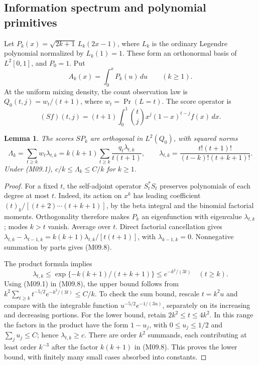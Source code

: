 \documentclass[11pt,a4paper]{article}
\newtheorem{lemma}[theorem]{Lemma}
\theoremstyle{definition}\newtheorem{definition}[theorem]{Definition}
\theoremstyle{remark}\newtheorem{remark}[theorem]{Remark}
\numberwithin{equation}{section}
\begin{document}
\subsection{Information spectrum and polynomial primitives}\label{M09-sec-3}
Let $P_k(x)=\sqrt{2k+1}\,L_k(2x-1)$, where $L_k$ is the ordinary Legendre polynomial normalized by $L_k(1)=1$. These form an orthonormal basis of $L^2[0,1]$, and $P_0=1$. Put
\[
 A_k(x)=\int_0^xP_k(u)\,du\qquad(k\ge1).
\]
At the uniform mixing density, the count observation law is $Q_0(t,j)=w_t/(t+1)$, where $w_t=\Pr(L=t)$. The score operator is
\[
 (Sf)(t,j)=(t+1)\int_0^1 \binom{t}{j}x^j(1-x)^{t-j}f(x)\,dx.
\]

\begin{lemma}\label{M09-lem:spectrum}
The scores $SP_k$ are orthogonal in $L^2(Q_0)$, with squared norms
\[
 \Lambda_k=\sum_{t\ge k}w_t\lambda_{t,k}
 =k(k+1)\sum_{t\ge k}\frac{q_t\lambda_{t,k}}{t(t+1)},\qquad
 \lambda_{t,k}=\frac{t!(t+1)!}{(t-k)!(t+k+1)!}.\tag{M09.8}
\]
Under (M09.1), $c/k\le\Lambda_k\le C/k$ for $k\ge1$.
\end{lemma}
\begin{proof}
For a fixed $t$, the self-adjoint operator $S_t^*S_t$ preserves polynomials of each degree at most $t$. Indeed, its action on $x^k$ has leading coefficient $(t)_k/[(t+2)\cdots(t+k+1)]$, by the beta integral and the binomial factorial moments. Orthogonality therefore makes $P_k$ an eigenfunction with eigenvalue $\lambda_{t,k}$; modes $k>t$ vanish. Average over $t$. Direct factorial cancellation gives
$\lambda_{t,k}-\lambda_{t-1,k}=k(k+1)\lambda_{t,k}/[t(t+1)]$, with $\lambda_{k-1,k}=0$. Nonnegative summation by parts gives (M09.8).

The product formula implies
\[
 \lambda_{t,k}\le\exp\{-k(k+1)/(t+k+1)\}\le e^{-k^2/(3t)}\quad(t\ge k).
\]
Using (M09.1) in (M09.8), the upper bound follows from
$k^2\sum_{t\ge k}t^{-5/2}e^{-k^2/(3t)}\le C/k$. To check the sum bound, rescale $t=k^2u$ and compare with the integrable function $u^{-5/2}e^{-1/(3u)}$, separately on its increasing and decreasing portions. For the lower bound, retain $2k^2\le t\le4k^2$. In this range the factors in the product have the form $1-u_j$, with $0\le u_j\le1/2$ and $\sum_j u_j\le C$; hence $\lambda_{t,k}\ge c$. There are order $k^2$ summands, each contributing at least order $k^{-3}$ after the factor $k(k+1)$ in (M09.8). This proves the lower bound, with finitely many small cases absorbed into constants.
\end{proof}
\end{document}
